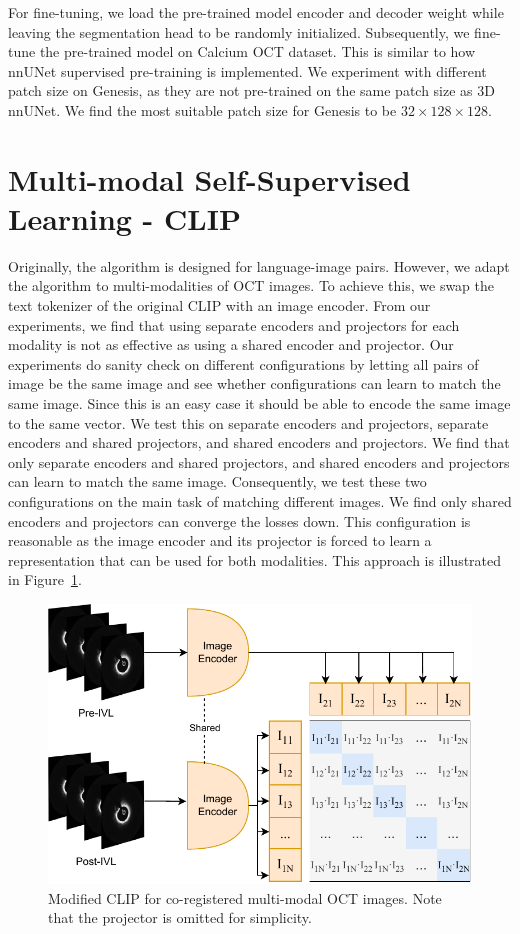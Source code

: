 \documentclass[a4paper,11pt,oneside]{report}
\begin{document}
For fine-tuning, we load the pre-trained model encoder and decoder weight while leaving the segmentation head to be randomly initialized. Subsequently, we fine-tune the pre-trained model on Calcium OCT dataset. This is similar to how nnUNet supervised pre-training is implemented. We experiment with different patch size on Genesis, as they are not pre-trained on the same patch size as 3D nnUNet. We find the most suitable patch size for Genesis to be $32\times 128\times 128$.

\section{Multi-modal Self-Supervised Learning - CLIP}\label{sec:implementation:clip}
Originally, the algorithm is designed for language-image pairs. However, we adapt the algorithm to multi-modalities of OCT images. To achieve this, we swap the text tokenizer of the original CLIP with an image encoder. From our experiments, we find that using separate encoders and projectors for each modality is not as effective as using a shared encoder and projector. Our experiments do sanity check on different configurations by letting all pairs of image be the same image and see whether configurations can learn to match the same image. Since this is an easy case it should be able to encode the same image to the same vector. We test this on separate encoders and projectors, separate encoders and shared projectors, and shared encoders and projectors. We find that only separate encoders and shared projectors, and shared encoders and projectors can learn to match the same image. Consequently, we test these two configurations on the main task of matching different images. We find only shared encoders and projectors can converge the losses down. This configuration is reasonable as the image encoder and its projector is forced to learn a representation that can be used for both modalities. This approach is illustrated in Figure~\ref{fig:clip-oct}.

\begin{figure}[ht]
    \centering
    \includegraphics[width=0.5\linewidth]{figures/fig_implementation_clip_oct.pdf}
    \caption{Modified CLIP for co-registered multi-modal OCT images. Note that the projector is omitted for simplicity.}
    \label{fig:clip-oct}
\end{figure}
\end{document}

